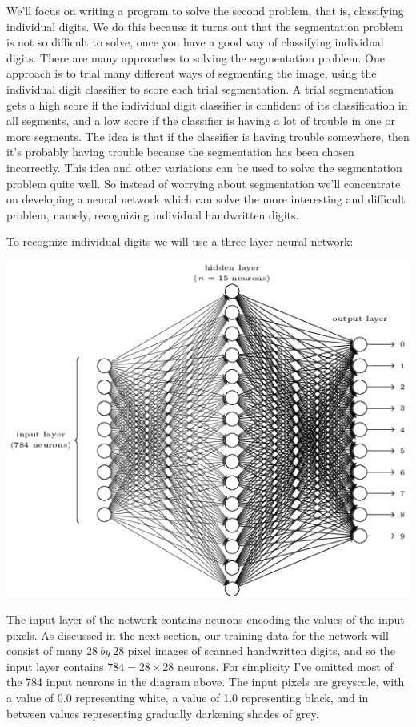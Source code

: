 \documentclass[a4paper,12pt]{report}%
\begin{document}
\bigskip

We'll focus on writing a program to solve the second problem, that is, classifying individual digits. We do this because it turns out that the segmentation problem is not so difficult to solve, once you have a good way of classifying individual digits. There are many approaches to solving the segmentation problem. One approach is to trial many different ways of segmenting the image, using the individual digit classifier to score each trial segmentation. A trial segmentation gets a high score if the individual digit classifier is confident of its classification in all segments, and a low score if the classifier is having a lot of trouble in one or more segments. The idea is that if the classifier is having trouble somewhere, then it's probably having trouble because the segmentation has been chosen incorrectly. This idea and other variations can be used to solve the segmentation problem quite well. So instead of worrying about segmentation we'll concentrate on developing a neural network which can solve the more interesting and difficult problem, namely, recognizing individual handwritten digits.

To recognize individual digits we will use a three-layer neural network:

\begin{center}
 \includegraphics[width=0.85\linewidth]{images/tikz12.png}
\end{center}

The input layer of the network contains neurons encoding the values of the input pixels. As discussed in the next section, our training data for the network will consist of many $28~by~28$ pixel images of scanned handwritten digits, and so the input layer contains $784=28\times28$ neurons. For simplicity I've omitted most of the 784 input neurons in the diagram above. The input pixels are greyscale, with a value of 0.0 representing white, a value of 1.0 representing black, and in between values representing gradually darkening shades of grey.
\end{document}
